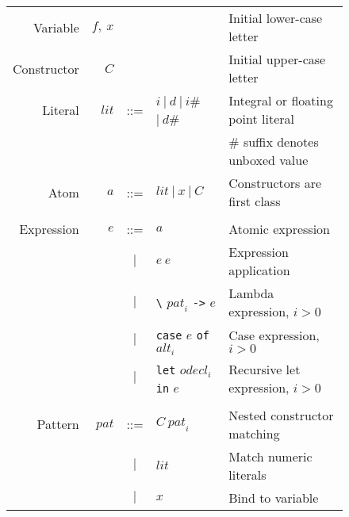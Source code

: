 \documentclass{llncs}
\begin{document}
\newcommand{\hash}{{\scriptsize\#}}

\begin{figure}
\centering
\footnotesize %
\begin{tabular}{r r c l l}
Variable         & $f,\ x$             &     &  & Initial lower-case letter \\

Constructor        & $C$                 &     & & Initial upper-case letter \\

Literal            & $\mathit{lit}$      & ::= & $i\ |\ d\ 
                                                 |\ i$\hash\ $|\ d$\hash & Integral or floating point literal \\

                   &                     &     &  & \# suffix denotes unboxed value \\

Atom               & $a$                 & ::= & $\mathit{lit}\ |\ x\ |\ C$ & Constructors are first class \\%
\\


Expression         & $e$                 & ::= & $a$ & Atomic expression \\

                   &                     & $|$ & $e\ e$ & Expression application \\

                   &                     & $|$ & \texttt{\textbackslash} $\mathit{pat}_i$ 
                                                 \texttt{->} $e$ & Lambda expression, $i > 0$ \\

                   &                     & $|$ & \texttt{case} $e$ \texttt{of} $\mathit{alt}_i$ & Case expression, $i > 0$\\

                   &                     & $|$ & \texttt{let} $\mathit{odecl}_i$ \texttt{in} $e$ & Recursive let expression, $i > 0$ \\

\\
Pattern            & $\mathit{pat}$      & ::= & $C\ \mathit{pat}_i$ & Nested constructor matching \\
                   &                     & $|$ & $\mathit{lit}$ & Match numeric literals \\
                   &                     & $|$ & $x$ & Bind to variable \\


\end{tabular}
\end{figure}
\end{document}
